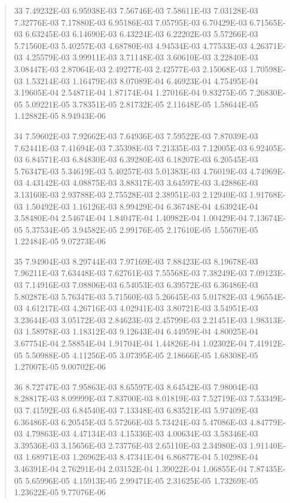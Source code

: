 \documentclass[letterpaper,10pt,english]{sphinxmanual}
\begin{document}
\begin{quote}
\begin{DUlineblock}{0em}
\item[] 33   7.49232E-03  6.95938E-03  7.56746E-03  7.58611E-03  7.03128E-03  7.32776E-03  7.17880E-03  6.95186E-03  7.05795E-03  6.70429E-03  6.71565E-03  6.63245E-03  6.14690E-03  6.43224E-03  6.22202E-03  5.57266E-03  5.71560E-03  5.40257E-03  4.68780E-03  4.94534E-03  4.77533E-03  4.26371E-03  4.25579E-03  3.99911E-03  3.71148E-03  3.60610E-03  3.22840E-03  3.08447E-03  2.87064E-03  2.49277E-03  2.42577E-03  2.15068E-03  1.70598E-03  1.53214E-03  1.16479E-03  8.07089E-04  6.46923E-04  4.75495E-04  3.19605E-04  2.54871E-04  1.87174E-04  1.27016E-04  9.83275E-05  7.26830E-05  5.09221E-05  3.78351E-05  2.81732E-05  2.11648E-05  1.58644E-05  1.12882E-05  8.94943E-06
\item[] 34   7.59602E-03  7.92662E-03  7.64936E-03  7.59522E-03  7.87039E-03  7.62441E-03  7.41694E-03  7.35398E-03  7.21335E-03  7.12005E-03  6.92405E-03  6.84571E-03  6.84830E-03  6.39280E-03  6.18207E-03  6.20545E-03  5.76347E-03  5.34619E-03  5.40257E-03  5.01383E-03  4.76019E-03  4.74969E-03  4.43142E-03  4.08875E-03  3.88317E-03  3.64597E-03  3.42886E-03  3.13160E-03  2.93788E-03  2.75528E-03  2.38951E-03  2.12940E-03  1.91768E-03  1.50492E-03  1.16126E-03  8.99429E-04  6.36748E-04  4.63924E-04  3.58480E-04  2.54674E-04  1.84047E-04  1.40982E-04  1.00429E-04  7.13674E-05  5.37534E-05  3.94582E-05  2.99176E-05  2.17610E-05  1.55670E-05  1.22484E-05  9.07273E-06
\item[] 35   7.94904E-03  8.29744E-03  7.97169E-03  7.88423E-03  8.19678E-03  7.96211E-03  7.63448E-03  7.62761E-03  7.55568E-03  7.38249E-03  7.09123E-03  7.14916E-03  7.08806E-03  6.54053E-03  6.39572E-03  6.36486E-03  5.80287E-03  5.76347E-03  5.71560E-03  5.26645E-03  5.01782E-03  4.96554E-03  4.61217E-03  4.26716E-03  4.02941E-03  3.80721E-03  3.54951E-03  3.23644E-03  3.05172E-03  2.84623E-03  2.45799E-03  2.21451E-03  1.98313E-03  1.58978E-03  1.18312E-03  9.12643E-04  6.44959E-04  4.80025E-04  3.67754E-04  2.58854E-04  1.91704E-04  1.44826E-04  1.02302E-04  7.41912E-05  5.50988E-05  4.11256E-05  3.07395E-05  2.18666E-05  1.68308E-05  1.27007E-05  9.00702E-06
\item[] 36   8.72747E-03  7.95863E-03  8.65597E-03  8.64542E-03  7.98004E-03  8.28817E-03  8.09999E-03  7.83700E-03  8.01819E-03  7.52719E-03  7.53349E-03  7.41592E-03  6.84540E-03  7.13348E-03  6.83521E-03  5.97409E-03  6.36486E-03  6.20545E-03  5.57266E-03  5.73424E-03  5.47086E-03  4.84779E-03  4.79863E-03  4.47134E-03  4.15336E-03  4.00634E-03  3.58346E-03  3.39536E-03  3.15656E-03  2.73776E-03  2.65110E-03  2.34980E-03  1.91140E-03  1.68971E-03  1.26962E-03  8.47341E-04  6.86877E-04  5.10298E-04  3.46391E-04  2.76291E-04  2.03152E-04  1.39022E-04  1.06855E-04  7.87435E-05  5.65996E-05  4.15913E-05  2.99471E-05  2.31625E-05  1.73269E-05  1.23622E-05  9.77076E-06

\end{DUlineblock}
\end{quote}
\end{document}
